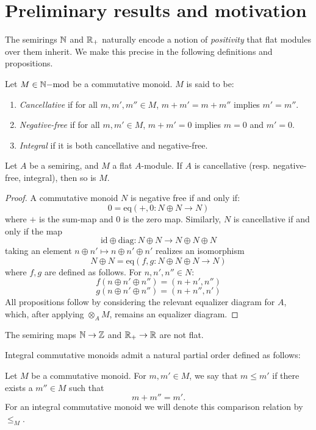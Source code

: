 \section{Preliminary results and motivation}
The semirings $\mathbb{N}$ and $\mathbb{R}_{+}$ naturally encode a notion of \textit{positivity} that flat modules over them inherit. 
We make this precise in the following definitions and propositions.
\begin{definition}
Let $M \in {\mathbb{N}}\mathrm{-mod}$ be a commutative monoid. $M$ is said to be:
\begin{enumerate}
\item[(i)] \textit{Cancellative} if for all $m,m',m'' \in M$, $m+m'=m+m''$ implies $m'=m''$.
\item[(ii)] \textit{Negative-free} if for all $m,m' \in M$, $m+m'=0$ implies $m=0$ and $m'=0$.
\item[(iii)] \textit{Integral} if it is both cancellative and negative-free. 
\end{enumerate} 
\end{definition}
\begin{proposition}\label{prop:flatpositivity}
Let $A$ be a semiring, and $M$ a flat $A$-module. If $A$ is cancellative (resp. negative-free, integral), then so is $M$.
\end{proposition}
\begin{proof}
A commutative monoid $N$ is negative free if and only if:
\[0=\text{eq}(+,0: N\oplus N \to N)\]
where $+$ is the sum-map and $0$ is the zero map. Similarly, $N$ is cancellative if and only if the map
\[\text{id} \oplus \mathrm{diag}: N \oplus N \to N \oplus N \oplus N\]
taking an element $n\oplus n' \mapsto n \oplus n' \oplus n'$ realizes an isomorphism
\[N\oplus N = \text{eq}(f,g: N \oplus N \oplus N \to N)\]
where $f,g$ are defined as follows. For $n,n',n'' \in N$:
\[f(n \oplus n' \oplus n'') = (n+n', n'')\]
\[g(n \oplus n' \oplus n'') = (n+n'',n')\]
All propositions follow by considering the relevant equalizer diagram for $A$, which, 
after applying $\otimes_A M$, remains an equalizer diagram.
\end{proof}
\begin{corollary}\label{cor:NRnotflat}
The semiring maps $\mathbb{N} \rightarrow \mathbb{Z}$ and $\mathbb{R}_{+} \rightarrow \mathbb{R}$ are not flat.
\end{corollary}
Integral commutative monoids admit a natural partial order defined as follows:
\begin{definition}
Let $M$ be a commutative monoid. For $m,m' \in M$, we say that $m \le m'$ if there exists a $m'' \in M$ such that
\[m + m'' = m'.\] 
For an integral commutative monoid we will denote this comparison relation by $\le_M$.
\end{definition}
